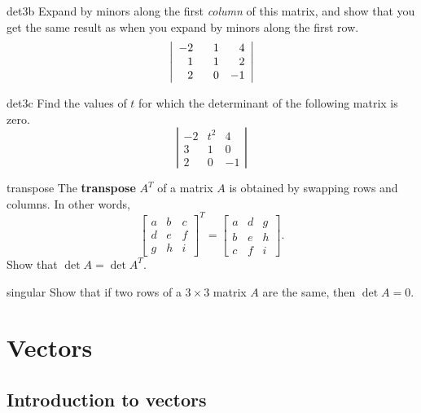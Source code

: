 \documentclass{watsonbook}
\begin{document}
\begin{exercise}{}{det3b}
  Expand by minors along the first \textit{column} of this matrix, and show that you get the same result as when you expand by minors along the first row. 
  \[
    \left|\begin{array}{ccc} -2 & \hphantom{-}1 & \hphantom{-}4 \\  \hphantom{-}1 & \hphantom{-}1 & \hphantom{-}2 \\ \hphantom{-}2 & \hphantom{-}0  & -1 \end{array}\right|
  \]
\end{exercise}

\begin{exercise}{}{det3c}
  Find the values of $t$ for which the determinant of the following matrix is zero.  
  \[
    \left|\begin{array}{ccc} -2 & t^2 & 4 \\  3 & 1 & 0 \\ 2 & 0  & -1 \end{array}\right|
  \]
\end{exercise}

\begin{exercise}{}{transpose}
  The \textbf{transpose} $A^T$ of a matrix $A$ is obtained by swapping rows and
  columns. In other words,
  \[
    \left[
      \begin{array}{ccc} a & b & c
        \\ d & e & f
        \\ g & h &i
      \end{array}\right]^T
    =
    \left[\begin{array}{ccc}
            a &
                d & g\\ b & e & h \\ c & f & i \end{array}\right]. 
  \]
  Show  that $\det A = \det A^T$. 
\end{exercise}

\begin{exercise}{}{singular}
  Show that if two rows of a $3 \times 3$ matrix $A$ are the same,
  then $\det A = 0$. 
\end{exercise}
        

\chapter{Vectors}

\section{Introduction to vectors} \label{sec:vectors} 
\end{document}
